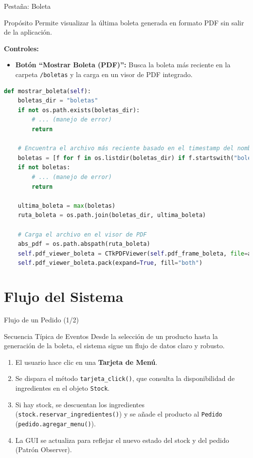 \documentclass[12pt]{beamer}
\begin{document}
\begin{frame}{Pestaña: Boleta}
  \begin{block}{Propósito}
    Permite visualizar la última boleta generada en formato PDF sin salir de la aplicación.
  \end{block}

  \textbf{Controles:}
  \begin{itemize}
    \item \textbf{Botón ``Mostrar Boleta (PDF)'':} Busca la boleta más reciente en la carpeta \texttt{/boletas} y la carga en un visor de PDF integrado.
  \end{itemize}

  \begin{lstlisting}[language=Python, caption={Lógica para encontrar y mostrar la última boleta}]
def mostrar_boleta(self):
    boletas_dir = "boletas"
    if not os.path.exists(boletas_dir):
        # ... (manejo de error)
        return

    # Encuentra el archivo más reciente basado en el timestamp del nombre
    boletas = [f for f in os.listdir(boletas_dir) if f.startswith("boleta_")]
    if not boletas:
        # ... (manejo de error)
        return

    ultima_boleta = max(boletas)
    ruta_boleta = os.path.join(boletas_dir, ultima_boleta)
    
    # Carga el archivo en el visor de PDF
    abs_pdf = os.path.abspath(ruta_boleta)
    self.pdf_viewer_boleta = CTkPDFViewer(self.pdf_frame_boleta, file=abs_pdf)
    self.pdf_viewer_boleta.pack(expand=True, fill="both")
  \end{lstlisting}
\end{frame}

\section{Flujo del Sistema}

\begin{frame}{Flujo de un Pedido (1/2)}
  \begin{block}{Secuencia Típica de Eventos}
    Desde la selección de un producto hasta la generación de la boleta, el sistema sigue un flujo de datos claro y robusto.
  \end{block}
  \begin{enumerate}
    \item El usuario hace clic en una \textbf{Tarjeta de Menú}.
    \item Se dispara el método \texttt{tarjeta\_click()}, que consulta la disponibilidad de ingredientes en el objeto \texttt{Stock}.
    \item Si hay stock, se descuentan los ingredientes (\texttt{stock.reservar\_ingredientes()}) y se añade el producto al \texttt{Pedido} (\texttt{pedido.agregar\_menu()}).  
    \item La GUI se actualiza para reflejar el nuevo estado del stock y del pedido (Patrón Observer).  
  \end{enumerate}
\end{frame}
\end{document}

